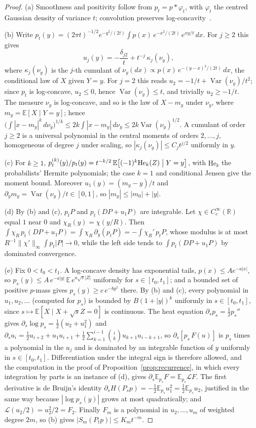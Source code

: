 \documentclass[11pt]{article}
\theoremstyle{definition}
\theoremstyle{remark}
\newcommand{\R}{\mathbb R}
\newcommand{\E}{\mathbb E}
\newcommand{\Var}{\operatorname{Var}}
\newcommand{\He}{\mathrm{He}}
\begin{document}
\begin{proof}
(a) Smoothness and positivity follow from $p_t=p*\varphi_t$, with $\varphi_t$ the
centred Gaussian density of variance $t$; convolution preserves
log-concavity~\cite[Proposition~3.5]{SW14}.

(b) Write $p_t(y)=(2\pi t)^{-1/2}e^{-y^2/(2t)}\int p(x)\,e^{-x^2/(2t)}\,e^{xy/t}\,dx$.
For $j\ge2$ this gives
\[
 u_j(y)=-\frac{\delta_{j2}}{t}+t^{-j}\,\kappa_j(\nu_y),
\]
where $\kappa_j(\nu_y)$ is the $j$-th cumulant of
$\nu_y(dx)\propto p(x)\,e^{-(y-x)^2/(2t)}\,dx$, the conditional law of $X$ given
$Y=y$. For $j=2$ this reads $u_2=-1/t+\Var(\nu_y)/t^2$; since $p_t$ is log-concave,
$u_2\le0$, hence $\Var(\nu_y)\le t$, and trivially $u_2\ge-1/t$. The measure $\nu_y$
is log-concave, and so is the law of $X-m_y$ under $\nu_y$, where
$m_y=\E[X\mid Y=y]$; hence~\cite[Theorem~5.22]{LV07}
$\bigl(\int|x-m_y|^k\,d\nu_y\bigr)^{1/k}\le2k\int|x-m_y|\,d\nu_y\le2k\Var(\nu_y)^{1/2}$.
A cumulant of order $j\ge2$ is a universal polynomial in the central moments of
orders $2,\dots,j$, homogeneous of degree $j$ under scaling, so
$|\kappa_j(\nu_y)|\le C_jt^{j/2}$ uniformly in $y$.

(c) For $k\ge1$,
$p_t^{(k)}(y)/p_t(y)=t^{-k/2}\,\E\bigl[(-1)^k\He_k(Z)\bigm| Y=y\bigr]$, with $\He_k$
the probabilists' Hermite polynomials; the case $k=1$ and conditional Jensen give the
moment bound. Moreover $u_1(y)=(m_y-y)/t$ and $\partial_ym_y=\Var(\nu_y)/t\in[0,1]$,
so $|m_y|\le|m_0|+|y|$.

(d) By (b) and (c), $p_tP$ and $p_t(DP+u_1P)$ are integrable. Let
$\chi\in C_c^\infty(\R)$ equal $1$ near $0$ and $\chi_R(y)=\chi(y/R)$. Then
$\int\chi_R\,p_t(DP+u_1P)=\int\chi_R\,\partial_y(p_tP)=-\int\chi_R'\,p_tP$, whose
modulus is at most $R^{-1}\|\chi'\|_\infty\int p_t|P|\to0$, while the left side tends
to $\int p_t(DP+u_1P)$ by dominated convergence.

(e) Fix $0<t_0<t_1$. A log-concave density has exponential tails,
$p(x)\le Ae^{-a|x|}$, so $p_s(y)\le A\,e^{-a|y|}\,\E\,e^{a\sqrt s|Z|}$ uniformly for
$s\in[t_0,t_1]$; and a bounded set of positive $p$-mass gives
$p_s(y)\ge c\,e^{-by^2}$ there. By (b) and (c), every polynomial in $u_1,u_2,\dots$
(computed for $p_s$) is bounded by $B(1+|y|)^k$ uniformly in $s\in[t_0,t_1]$, since
$s\mapsto\E[X\mid X+\sqrt sZ=0]$ is continuous. The heat equation
$\partial_sp_s=\tfrac12p_s''$ gives $\partial_s\log p_s=\tfrac12(u_2+u_1^2)$ and
$\partial_su_i=\tfrac12u_{i+2}+u_1u_{i+1}+\tfrac12\sum_{k=1}^{i-1}\binom ik
u_{k+1}u_{i-k+1}$, so $\partial_s[p_s\,F(u)]$ is $p_s$ times a polynomial in the $u_j$
and is dominated by an integrable function of $y$ uniformly in $s\in[t_0,t_1]$.
Differentiation under the integral sign is therefore allowed, and the computation in
the proof of Proposition~\ref{prop:recurrence}, in which every integration by parts is
an instance of (d), gives $\partial_s\E_{p_s}F=\E_{p_s}\mathcal LF$. The first
derivative is de Bruijn's identity
$\partial_sH(P_sp)=-\tfrac12\E_{p_s}u_1^2=\tfrac12\E_{p_s}u_2$, justified in the same
way because $|\log p_s(y)|$ grows at most quadratically; and
$\mathcal L(u_2/2)=u_2^2/2=F_2$. Finally $F_m$ is a polynomial in $u_2,\dots,u_m$ of
weighted degree $2m$, so (b) gives $|S_m(P_tp)|\le K_mt^{-m}$.
\end{proof}
\end{document}
